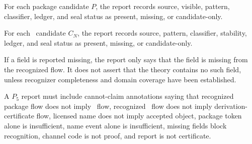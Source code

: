 \begin{definition}
\label{def:pkg-namecert-package-field-status}
For each package candidate $P$, the report records source, visible, pattern, classifier, ledger, and seal status as present, missing, or candidate-only.
\end{definition}

\begin{definition}
\label{def:pkg-namecert-namecert-field-status}
For each \NameCert\ candidate $C_N$, the report records source, pattern, classifier, stability, ledger, and seal status as present, missing, or candidate-only.
\end{definition}

\begin{principle}
\label{prin:pkg-namecert-missing-field-not-negative-theorem}
If a field is reported missing, the report only says that the field is missing from the recognized flow. It does not assert that the theory contains no such field, unless recognizer completeness and domain coverage have been established.
\end{principle}

\begin{definition}
\label{def:pkg-namecert-p5-cannot-claims}
A $P_5$ report must include cannot-claim annotations saying that recognized package flow does not imply \NameCert\ flow, recognized \NameCert\ flow does not imply derivation-certificate flow, licensed name does not imply accepted object, package token alone is insufficient, name event alone is insufficient, missing fields block recognition, channel code is not proof, and report is not certificate.
\end{definition}

